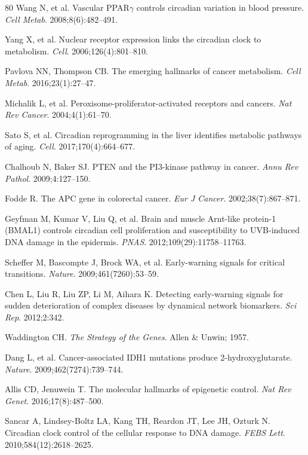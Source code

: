 \documentclass[11pt,a4paper]{article}
\begin{document}
\begin{thebibliography}{80}
Wang N, et al. Vascular PPAR$\gamma$ controls circadian variation in blood pressure. \textit{Cell Metab}. 2008;8(6):482--491.

Yang X, et al. Nuclear receptor expression links the circadian clock to metabolism. \textit{Cell}. 2006;126(4):801--810.

Pavlova NN, Thompson CB. The emerging hallmarks of cancer metabolism. \textit{Cell Metab}. 2016;23(1):27--47.

Michalik L, et al. Peroxisome-proliferator-activated receptors and cancers. \textit{Nat Rev Cancer}. 2004;4(1):61--70.

Sato S, et al. Circadian reprogramming in the liver identifies metabolic pathways of aging. \textit{Cell}. 2017;170(4):664--677.

Chalhoub N, Baker SJ. PTEN and the PI3-kinase pathway in cancer. \textit{Annu Rev Pathol}. 2009;4:127--150.

Fodde R. The APC gene in colorectal cancer. \textit{Eur J Cancer}. 2002;38(7):867--871.

Geyfman M, Kumar V, Liu Q, et al. Brain and muscle Arnt-like protein-1 (BMAL1) controls circadian cell proliferation and susceptibility to UVB-induced DNA damage in the epidermis. \textit{PNAS}. 2012;109(29):11758--11763.

Scheffer M, Bascompte J, Brock WA, et al. Early-warning signals for critical transitions. \textit{Nature}. 2009;461(7260):53--59.

Chen L, Liu R, Liu ZP, Li M, Aihara K. Detecting early-warning signals for sudden deterioration of complex diseases by dynamical network biomarkers. \textit{Sci Rep}. 2012;2:342.

Waddington CH. \textit{The Strategy of the Genes}. Allen \& Unwin; 1957.

Dang L, et al. Cancer-associated IDH1 mutations produce 2-hydroxyglutarate. \textit{Nature}. 2009;462(7274):739--744.

Allis CD, Jenuwein T. The molecular hallmarks of epigenetic control. \textit{Nat Rev Genet}. 2016;17(8):487--500.

Sancar A, Lindsey-Boltz LA, Kang TH, Reardon JT, Lee JH, Ozturk N. Circadian clock control of the cellular response to DNA damage. \textit{FEBS Lett}. 2010;584(12):2618--2625.


\end{thebibliography}
\end{document}
